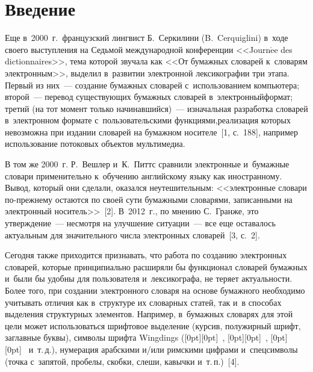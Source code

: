 




\thispagestyle{headings}

\begin{multicols}{2}

\label{st\stat}
  
\section{Введение}

  Еще в~2000~г.\ французский лингвист Б.~Серкилини (B.~Cerquiglini) 
в~ходе своего выступления на Седьмой международной конференции 
<<Journ$\acute{\mbox{e}}$e des dictionnaires>>, тема которой звучала как 
<<От бумажных словарей к~словарям электронным>>, выделил в~развитии 
электронной лексикографии три этапа. Первый из них~--- создание 
бумажных словарей с~использованием компьютера; второй~--- перевод 
существующих бумажных словарей в~электронный\linebreak формат; третий (на тот 
момент только начинавшийся)~--- изначальная разработка словарей 
в~электронном формате с~пользовательскими функциями,\linebreak реализация 
которых невозможна при издании словарей на бумажном носителе~[1, 
с.~188], например использование потоковых объектов мультимедиа.
  
  В том же 2000~г. Р.~Вешлер и~К.~Питтс сравнили электронные 
и~бумажные словари применительно к~обучению английскому языку как 
иностранному. Вывод, который они сделали, оказался неутешительным: 
<<электронные словари по-преж\-не\-му остаются по своей сути бумажными 
словарями, записанными на электронный носитель>>~[2]. В~2012~г., по 
мнению С.~Гранже, это утверждение~--- не\-смот\-ря на улучшение  
ситуации~--- все еще оставалось актуальным для значительного числа 
электронных словарей~[3, с.~2].
  
  Сегодня также приходится признавать, что работа по созданию 
электронных словарей, которые принципиально расширяли бы функционал 
словарей бумажных и~были бы удобны для пользователя и~лексикографа, не 
теряет актуальности. Более того, при создании электронного словаря на 
основе бумажного необходимо учитывать отличия как в~структуре их 
словарных статей, так и~в способах выделения структурных элементов. 
Например, в~бумажных словарях для этой цели может использоваться 
шрифтовое выделение (курсив, полужирный шрифт, заглавные буквы), 
символы шрифта Wingdings (\raisebox{-1pt}[0pt][0pt]{\mbox{%
   \epsfxsize=2.5mm 
   }}, \raisebox{-1pt}[0pt][0pt]{\mbox{%
   \epsfxsize=2.5mm 
   }}, \raisebox{-1pt}[0pt][0pt]{\mbox{%
   \epsfxsize=3.5mm 
   }} и~т.\,д.), нумерация арабскими и/или римскими цифрами и~спецсимволы 
(точка с~запятой, пробелы, скобки, слеши, кавычки и~т.\,п.)~[4].


\end{multicols}
